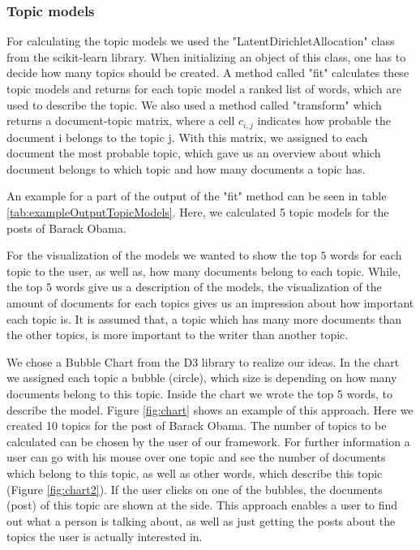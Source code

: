 \subsubsection{Topic models}


For calculating the topic models we used the "LatentDirichletAllocation" class from the scikit-learn library. When initializing an object of this class, one has to  decide how many topics should be created. A method called "fit" calculates these topic models and returns for each topic model a ranked list of words, which are used to describe the topic. We also used a method called  "transform" which returns 
a document-topic matrix, where a cell $ c_{i,j} $ indicates how probable the document i belongs to the topic j. With this matrix, we assigned to each document the most probable topic, which gave us an overview about which document belongs to which topic and how many documents a topic has.  


An example for a part of the  output of the "fit" method can be seen in table \ref{tab:exampleOutputTopicModels}. Here, we calculated 5 topic models for the posts of Barack Obama.


For the visualization of the models we wanted to show the top $5$ words for each topic to the user, as well as, how many documents belong to each topic. While, the top $5$ words give us a description of the models, the visualization of the amount of documents for each topics gives us an impression about how important each topic is. It is assumed that, a topic which has many more documents than the other topics, is more important to the writer than another topic.


We chose a Bubble Chart from the D3 library to realize our ideas. In the chart we assigned each topic a bubble (circle), which size is depending on how many documents belong to this topic. Inside the chart we wrote the top 5 words, to describe the model. Figure \ref{fig:chart} shows an example of this approach. Here we created 10 topics for the post of Barack Obama. The number of topics to be calculated can be chosen by the user of our framework. For further information a user can go with his mouse over one topic and see the number of documents which belong to this topic, as well as other words, which describe this topic (Figure \ref{fig:chart2}). If the user clicks on one of the bubbles, the documents (post) of this topic are shown at the side. This approach enables a user to find out what a person is talking about, as well as just getting the posts about the topics the user is actually interested in. 

